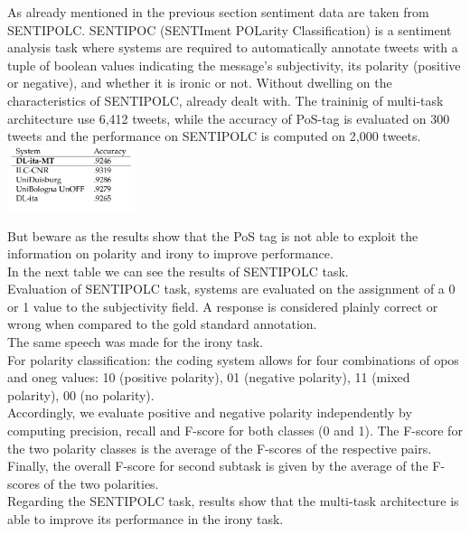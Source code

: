 \documentclass[twocolumn,10pt]{wmrDoc}
\begin{document}
As already mentioned in the previous section sentiment data are taken from
SENTIPOLC. SENTIPOC (SENTIment POLarity Classification) is a sentiment analysis task where systems are required to automatically annotate tweets with a tuple of boolean values indicating the message’s subjectivity, its polarity (positive or negative), and whether it is ironic or not.
Without dwelling on the characteristics of SENTIPOLC, already dealt with.
 The traininig of multi-task architecture use 6,412 tweets, while the accuracy of PoS-tag is evaluated on 300 tweets and the performance on SENTIPOLC is computed on 2,000 tweets.\\
 
\vskip 0.5cm
\includegraphics[width=0.28\textwidth]{figure/Multiresult.png}
\vskip0.5cm


But beware as the results show that the PoS tag is not able to exploit the information on polarity and irony to improve performance.\\


In the next table we can see the results of SENTIPOLC task.\\
Evaluation of SENTIPOLC task, systems are evaluated on the assignment of a 0 or 1 value to the subjectivity field. A response is considered plainly correct or wrong when compared to the gold standard annotation.\\
The same speech was made for the irony task.\\
For polarity classification: the coding system allows for four combinations of opos and oneg values: 10 (positive polarity), 01 (negative polarity), 11 (mixed polarity), 00 (no polarity).\\
Accordingly, we evaluate positive and negative polarity independently by computing precision, recall and F-score for both classes (0 and 1). The F-score for the two polarity classes is the average of the F-scores of the respective pairs.
Finally, the overall F-score for second subtask is given by the average of the F-scores of the two polarities.\\
Regarding the SENTIPOLC task, results show that the multi-task architecture is able to improve its performance in the irony task. 
\end{document}
